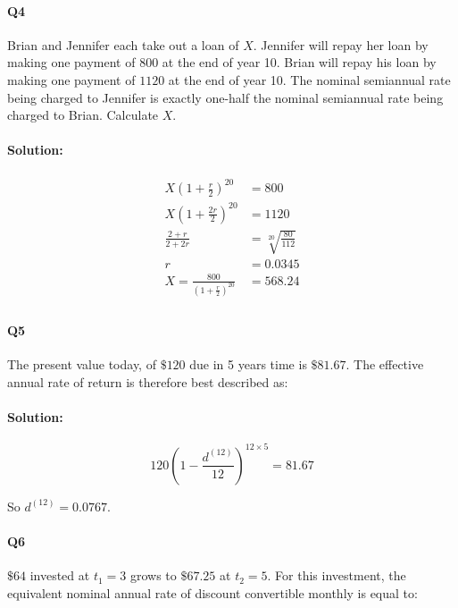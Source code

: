 \documentclass[a4paper, 11pt, twoside]{article}
\begin{document}
\paragraph{Q4} Brian and Jennifer each take out a loan of $X$. Jennifer will repay her loan by making one payment of $800$ at the end of year 10. Brian will repay his loan by making one payment of $1120$ at the end of year 10. The nominal semiannual rate being charged to Jennifer is exactly one-half the nominal semiannual rate being charged to Brian. Calculate $X$.\\

\paragraph{Solution:}

\[
\begin{split}
	X(1+\frac{r}{2})^{20} &= 800\\
	X(1+\frac{2r}{2})^{20} &= 1120\\
	\frac{2+r}{2+2r} &= \sqrt[20]{\frac{80}{112}} \\
	r &= 0.0345 \\
	X = \frac{800}{(1+\frac{r}{2})^{20}} &= 568.24\\
\end{split}
\]

\paragraph{Q5} The present value today, of $\$120$ due in 5 years time is $\$81.67$. The effective annual rate of return is therefore best described as:\\

\paragraph{Solution:} 

\[120\left(1-\frac{d^{(12)}}{12}\right)^{12\times 5}=81.67\]

So $d^{(12)}=0.0767.$\\

\paragraph{Q6} $\$64$ invested at $t_1=3$ grows to $\$67.25$ at $t_2=5$. For this investment, the equivalent nominal annual rate of discount convertible monthly is equal to:\\
\end{document}
